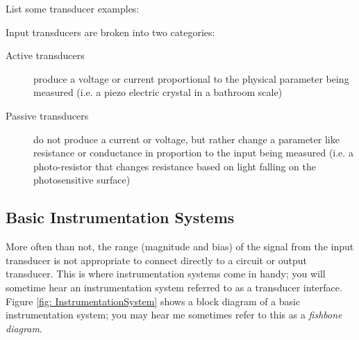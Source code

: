 \documentclass{handout}
\begin{document}

List some transducer examples:


Input transducers are broken into two categories:
\begin{description}
\item[Active transducers] produce a voltage or current proportional to the physical parameter being measured (i.e. a piezo electric crystal in a bathroom scale)
\item[Passive transducers] do not produce a current or voltage, but rather change a parameter like resistance or conductance in proportion to the input being measured (i.e. a photo-resistor that changes resistance based on light falling on the photosensitive surface)
\end{description}

\subsection{Basic Instrumentation Systems}

More often than not, the range (magnitude and bias) of the signal from the input transducer is not appropriate to connect directly to a circuit or output transducer.  This is where instrumentation systems come in handy; you will sometime hear an instrumentation system referred to as a transducer interface.  Figure \ref{fig: InstrumentationSystem} shows a block diagram of a basic instrumentation system; you may hear me sometimes refer to this as a {\em fishbone diagram}.  
\end{document}
